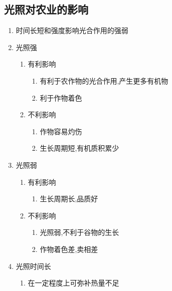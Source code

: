 \documentclass[a4paper]{article}
\begin{document}
    \subsection{光照对农业的影响}
    \begin{enumerate}
        \item 时间长短和强度影响光合作用的强弱
        \item 光照强
        \begin{enumerate}
            \item 有利影响
            \begin{enumerate}
                \item 有利于农作物的光合作用,产生更多有机物
                \item 利于作物着色
            \end{enumerate}
            \item 不利影响
            \begin{enumerate}
                \item 作物容易灼伤
                \item 生长周期短,有机质积累少
            \end{enumerate}
        \end{enumerate}
        \item 光照弱
        \begin{enumerate}
            \item 有利影响
            \begin{enumerate}
                \item 生长周期长,品质好
            \end{enumerate}
            \item 不利影响
            \begin{enumerate}
                \item 光照弱,不利于谷物的生长
                \item 作物着色差,卖相差
            \end{enumerate}
        \end{enumerate}
        \item 光照时间长
        \begin{enumerate}
            \item 在一定程度上可弥补热量不足
        \end{enumerate}
    \end{enumerate}
\end{document}
